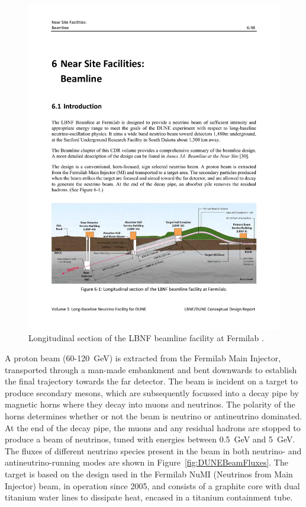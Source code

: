 \begin{figure}
  \centering
  \includegraphics[width=14cm]{DUNEBeam.pdf}
  \caption[Longitudinal section of the LBNF beamline facility at Fermilab.]{Longitudinal section of the LBNF beamline facility at Fermilab \cite{DUNECDR3}.}
  \label{fig:DUNEBeam}
\end{figure}

A proton beam (60-120~GeV) is extracted from the Fermilab Main Injector, transported through a man-made embankment and bent downwards to establish the final trajectory towards the far detector.  The beam is incident on a target to produce secondary mesons, which are subsequently focussed into a decay pipe by magnetic horns where they decay into muons and neutrinos.  The polarity of the horns determines whether or not the beam is neutrino or antineutrino dominated.  At the end of the decay pipe, the muons and any residual hadrons are stopped to produce a beam of neutrinos, tuned with energies between 0.5~GeV and 5~GeV.  The fluxes of different neutrino species present in the beam in both neutrino- and antineutrino-running modes are shown in Figure~\ref{fig:DUNEBeamFluxes}.  The target is based on the design used in the Fermilab NuMI (Neutrinos from Main Injector) beam, in operation since 2005, and consists of a graphite core with dual titanium water lines to dissipate heat, encased in a titanium containment tube.

